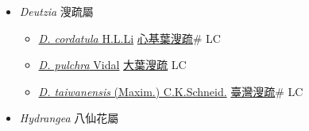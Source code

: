 
  \begin{itemize}
 \item[] \textit{Deutzia} 溲疏屬
                    
  \begin{itemize}
        \item[] \href{http://www.theplantlist.org/tpl1.1/search?q=Deutzia+cordatula}{\textit{D. cordatula} H.L.Li}   \href{\detokenize{http://taibnet.sinica.edu.tw/chi/taibnet_species_list.php?T2=心基葉溲疏&T2_new_value=true&fr=y}}{心基葉溲疏}\# LC
        \item[] \href{http://www.theplantlist.org/tpl1.1/search?q=Deutzia+pulchra}{\textit{D. pulchra} Vidal}   \href{\detokenize{http://taibnet.sinica.edu.tw/chi/taibnet_species_list.php?T2=大葉溲疏&T2_new_value=true&fr=y}}{大葉溲疏} LC
        \item[] \href{http://www.theplantlist.org/tpl1.1/search?q=Deutzia+taiwanensis}{\textit{D. taiwanensis} (Maxim.) C.K.Schneid.}   \href{\detokenize{http://taibnet.sinica.edu.tw/chi/taibnet_species_list.php?T2=臺灣溲疏&T2_new_value=true&fr=y}}{臺灣溲疏}\# LC
  \end{itemize}
 \item[] \textit{Hydrangea} 八仙花屬
                    

\end{itemize}
